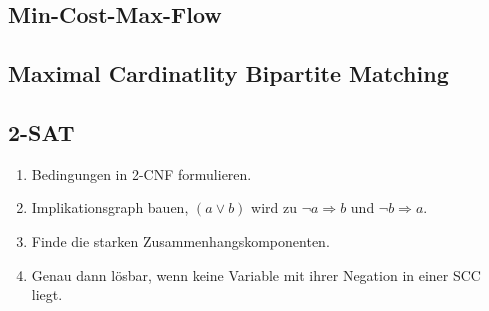 \subsection{Min-Cost-Max-Flow}


\subsection{Maximal Cardinatlity Bipartite Matching}\label{kuhn}


\subsection{2-SAT}
\begin{enumerate}
	\item Bedingungen in 2-CNF formulieren.
	\item Implikationsgraph bauen, $\left(a \vee b\right)$ wird zu $\neg a \Rightarrow b$ und $\neg b \Rightarrow a$.
	\item Finde die starken Zusammenhangskomponenten.
	\item Genau dann lösbar, wenn keine Variable mit ihrer Negation in einer SCC liegt.
\end{enumerate}

% 

% 

